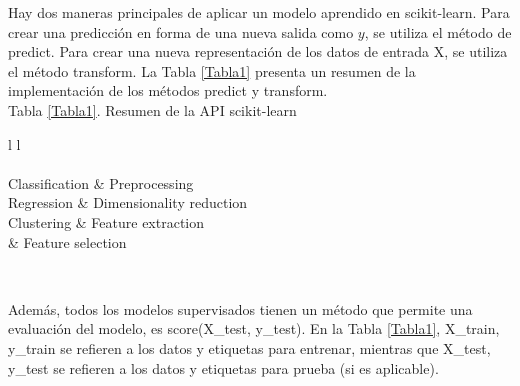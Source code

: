 {{\begin{minipage}[16cm]{13.5cm}
{{					
					
					Hay dos maneras principales de aplicar un modelo aprendido en   {\ttfamily scikit-learn}. Para crear una predicción  en forma de una nueva salida como $y$, se utiliza el método de  {\ttfamily predict}. Para crear una nueva representación de los datos de entrada X, se utiliza el método {\ttfamily transform}. La Tabla \ref{Tabla1} presenta un resumen de la implementación de los métodos {\ttfamily predict}  y  {\ttfamily transform}.\\
					
					
					
					
					
					
					Tabla \ref{Tabla1}.  Resumen de la API {\ttfamily scikit-learn}
					
					\begin{tabular}{l l }
						\\
						\\
						\hline
						Classification &\hspace{3cm} Preprocessing\\	
						Regression     &\hspace{3cm} Dimensionality reduction\\
						Clustering     &\hspace{3cm} Feature extraction\\
						&\hspace{3cm} Feature selection \\
						\hline
					\end{tabular}\label{Tabla1} \\
					\vspace{0.2cm}
					
					Además, todos los modelos supervisados tienen un método  que permite una evaluación del modelo, es   {\ttfamily score(X\_test, y\_test)}. En  la Tabla \ref{Tabla1},{ } {\ttfamily  X\_train,   y\_train }   se refieren a los datos y etiquetas para entrenar, mientras que  {\ttfamily X\_test,   y\_test}  se refieren a los datos y etiquetas para  prueba (si es aplicable).\\
					
					
					
					
					
			} }
			
\end{minipage}  }}


											